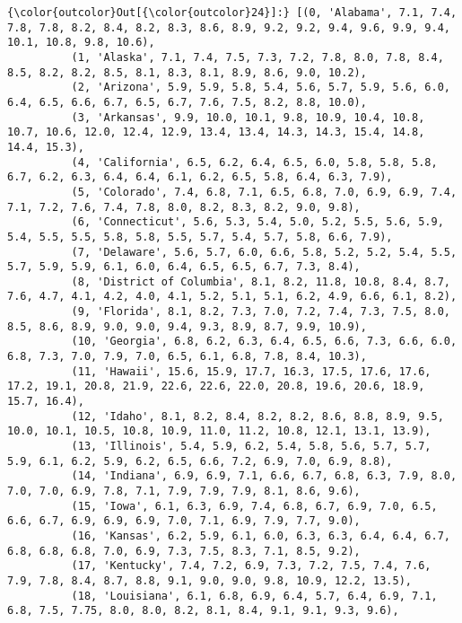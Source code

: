 \documentclass[11pt]{article}
\begin{document}
\begin{Verbatim}[commandchars=\\\{\}]
{\color{outcolor}Out[{\color{outcolor}24}]:} [(0, 'Alabama', 7.1, 7.4, 7.8, 7.8, 8.2, 8.4, 8.2, 8.3, 8.6, 8.9, 9.2, 9.2, 9.4, 9.6, 9.9, 9.4, 10.1, 10.8, 9.8, 10.6),
          (1, 'Alaska', 7.1, 7.4, 7.5, 7.3, 7.2, 7.8, 8.0, 7.8, 8.4, 8.5, 8.2, 8.2, 8.5, 8.1, 8.3, 8.1, 8.9, 8.6, 9.0, 10.2),
          (2, 'Arizona', 5.9, 5.9, 5.8, 5.4, 5.6, 5.7, 5.9, 5.6, 6.0, 6.4, 6.5, 6.6, 6.7, 6.5, 6.7, 7.6, 7.5, 8.2, 8.8, 10.0),
          (3, 'Arkansas', 9.9, 10.0, 10.1, 9.8, 10.9, 10.4, 10.8, 10.7, 10.6, 12.0, 12.4, 12.9, 13.4, 13.4, 14.3, 14.3, 15.4, 14.8, 14.4, 15.3),
          (4, 'California', 6.5, 6.2, 6.4, 6.5, 6.0, 5.8, 5.8, 5.8, 6.7, 6.2, 6.3, 6.4, 6.4, 6.1, 6.2, 6.5, 5.8, 6.4, 6.3, 7.9),
          (5, 'Colorado', 7.4, 6.8, 7.1, 6.5, 6.8, 7.0, 6.9, 6.9, 7.4, 7.1, 7.2, 7.6, 7.4, 7.8, 8.0, 8.2, 8.3, 8.2, 9.0, 9.8),
          (6, 'Connecticut', 5.6, 5.3, 5.4, 5.0, 5.2, 5.5, 5.6, 5.9, 5.4, 5.5, 5.5, 5.8, 5.8, 5.5, 5.7, 5.4, 5.7, 5.8, 6.6, 7.9),
          (7, 'Delaware', 5.6, 5.7, 6.0, 6.6, 5.8, 5.2, 5.2, 5.4, 5.5, 5.7, 5.9, 5.9, 6.1, 6.0, 6.4, 6.5, 6.5, 6.7, 7.3, 8.4),
          (8, 'District of Columbia', 8.1, 8.2, 11.8, 10.8, 8.4, 8.7, 7.6, 4.7, 4.1, 4.2, 4.0, 4.1, 5.2, 5.1, 5.1, 6.2, 4.9, 6.6, 6.1, 8.2),
          (9, 'Florida', 8.1, 8.2, 7.3, 7.0, 7.2, 7.4, 7.3, 7.5, 8.0, 8.5, 8.6, 8.9, 9.0, 9.0, 9.4, 9.3, 8.9, 8.7, 9.9, 10.9),
          (10, 'Georgia', 6.8, 6.2, 6.3, 6.4, 6.5, 6.6, 7.3, 6.6, 6.0, 6.8, 7.3, 7.0, 7.9, 7.0, 6.5, 6.1, 6.8, 7.8, 8.4, 10.3),
          (11, 'Hawaii', 15.6, 15.9, 17.7, 16.3, 17.5, 17.6, 17.6, 17.2, 19.1, 20.8, 21.9, 22.6, 22.6, 22.0, 20.8, 19.6, 20.6, 18.9, 15.7, 16.4),
          (12, 'Idaho', 8.1, 8.2, 8.4, 8.2, 8.2, 8.6, 8.8, 8.9, 9.5, 10.0, 10.1, 10.5, 10.8, 10.9, 11.0, 11.2, 10.8, 12.1, 13.1, 13.9),
          (13, 'Illinois', 5.4, 5.9, 6.2, 5.4, 5.8, 5.6, 5.7, 5.7, 5.9, 6.1, 6.2, 5.9, 6.2, 6.5, 6.6, 7.2, 6.9, 7.0, 6.9, 8.8),
          (14, 'Indiana', 6.9, 6.9, 7.1, 6.6, 6.7, 6.8, 6.3, 7.9, 8.0, 7.0, 7.0, 6.9, 7.8, 7.1, 7.9, 7.9, 7.9, 8.1, 8.6, 9.6),
          (15, 'Iowa', 6.1, 6.3, 6.9, 7.4, 6.8, 6.7, 6.9, 7.0, 6.5, 6.6, 6.7, 6.9, 6.9, 6.9, 7.0, 7.1, 6.9, 7.9, 7.7, 9.0),
          (16, 'Kansas', 6.2, 5.9, 6.1, 6.0, 6.3, 6.3, 6.4, 6.4, 6.7, 6.8, 6.8, 6.8, 7.0, 6.9, 7.3, 7.5, 8.3, 7.1, 8.5, 9.2),
          (17, 'Kentucky', 7.4, 7.2, 6.9, 7.3, 7.2, 7.5, 7.4, 7.6, 7.9, 7.8, 8.4, 8.7, 8.8, 9.1, 9.0, 9.0, 9.8, 10.9, 12.2, 13.5),
          (18, 'Louisiana', 6.1, 6.8, 6.9, 6.4, 5.7, 6.4, 6.9, 7.1, 6.8, 7.5, 7.75, 8.0, 8.0, 8.2, 8.1, 8.4, 9.1, 9.1, 9.3, 9.6),

\end{Verbatim}
\end{document}
